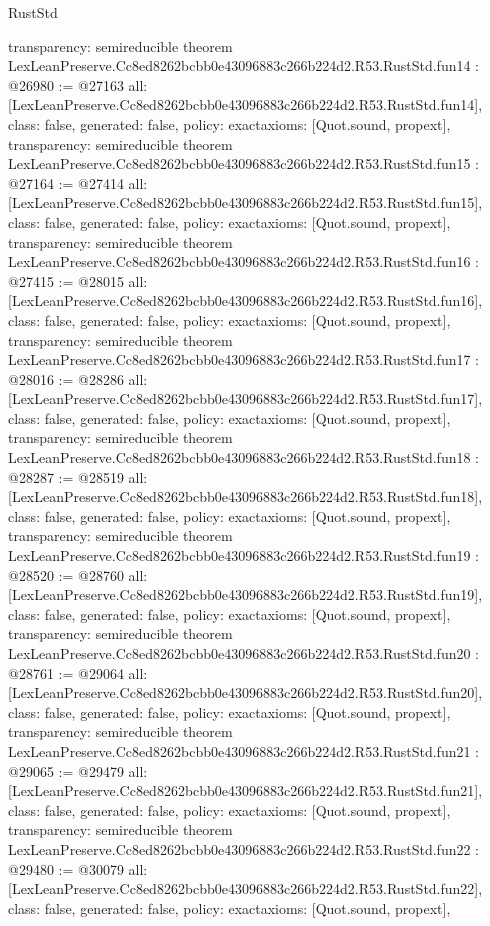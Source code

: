 \begin{lexlean}{RustStd}
\begin{coremodule}
{  transparency: semireducible
}
theorem LexLeanPreserve.Cc8ed8262bcbb0e43096883c266b224d2.R53.RustStd.fun14 : @26980 := @27163 {
  all: [LexLeanPreserve.Cc8ed8262bcbb0e43096883c266b224d2.R53.RustStd.fun14],
  class: false,
  generated: false,
  policy: exact{axioms: [Quot.sound, propext]},
  transparency: semireducible
}
theorem LexLeanPreserve.Cc8ed8262bcbb0e43096883c266b224d2.R53.RustStd.fun15 : @27164 := @27414 {
  all: [LexLeanPreserve.Cc8ed8262bcbb0e43096883c266b224d2.R53.RustStd.fun15],
  class: false,
  generated: false,
  policy: exact{axioms: [Quot.sound, propext]},
  transparency: semireducible
}
theorem LexLeanPreserve.Cc8ed8262bcbb0e43096883c266b224d2.R53.RustStd.fun16 : @27415 := @28015 {
  all: [LexLeanPreserve.Cc8ed8262bcbb0e43096883c266b224d2.R53.RustStd.fun16],
  class: false,
  generated: false,
  policy: exact{axioms: [Quot.sound, propext]},
  transparency: semireducible
}
theorem LexLeanPreserve.Cc8ed8262bcbb0e43096883c266b224d2.R53.RustStd.fun17 : @28016 := @28286 {
  all: [LexLeanPreserve.Cc8ed8262bcbb0e43096883c266b224d2.R53.RustStd.fun17],
  class: false,
  generated: false,
  policy: exact{axioms: [Quot.sound, propext]},
  transparency: semireducible
}
theorem LexLeanPreserve.Cc8ed8262bcbb0e43096883c266b224d2.R53.RustStd.fun18 : @28287 := @28519 {
  all: [LexLeanPreserve.Cc8ed8262bcbb0e43096883c266b224d2.R53.RustStd.fun18],
  class: false,
  generated: false,
  policy: exact{axioms: [Quot.sound, propext]},
  transparency: semireducible
}
theorem LexLeanPreserve.Cc8ed8262bcbb0e43096883c266b224d2.R53.RustStd.fun19 : @28520 := @28760 {
  all: [LexLeanPreserve.Cc8ed8262bcbb0e43096883c266b224d2.R53.RustStd.fun19],
  class: false,
  generated: false,
  policy: exact{axioms: [Quot.sound, propext]},
  transparency: semireducible
}
theorem LexLeanPreserve.Cc8ed8262bcbb0e43096883c266b224d2.R53.RustStd.fun20 : @28761 := @29064 {
  all: [LexLeanPreserve.Cc8ed8262bcbb0e43096883c266b224d2.R53.RustStd.fun20],
  class: false,
  generated: false,
  policy: exact{axioms: [Quot.sound, propext]},
  transparency: semireducible
}
theorem LexLeanPreserve.Cc8ed8262bcbb0e43096883c266b224d2.R53.RustStd.fun21 : @29065 := @29479 {
  all: [LexLeanPreserve.Cc8ed8262bcbb0e43096883c266b224d2.R53.RustStd.fun21],
  class: false,
  generated: false,
  policy: exact{axioms: [Quot.sound, propext]},
  transparency: semireducible
}
theorem LexLeanPreserve.Cc8ed8262bcbb0e43096883c266b224d2.R53.RustStd.fun22 : @29480 := @30079 {
  all: [LexLeanPreserve.Cc8ed8262bcbb0e43096883c266b224d2.R53.RustStd.fun22],
  class: false,
  generated: false,
  policy: exact{axioms: [Quot.sound, propext]},
}
\end{coremodule}
\end{lexlean}

